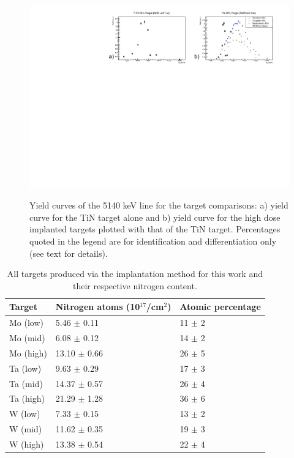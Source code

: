 \begin{figure}
\includegraphics[width=\linewidth]{figures/tiNcompare.pdf}
\label{fig: yieldComparison}
\caption{Yield curves of the 5140 keV line for the target comparisons: a) yield curve for the TiN target alone and b) yield curve for the high dose implanted targets plotted with that of the TiN target. Percentages quoted in the legend are for identification and differentiation only (see text for details).}
\end{figure}


\begin{table}[]
\centering
\begin{tabular}{@{}lll@{}}
\toprule
Target    & Nitrogen atoms (10$^{17}$/cm$^{2}$) & Atomic percentage \\ \midrule
Mo (low)  & 5.46 $\pm$ 0.11                     & 11 $\pm$ 2        \\
Mo (mid)  & 6.08 $\pm$ 0.12                     & 14 $\pm$ 2        \\
Mo (high) & 13.10 $\pm$ 0.66                    & 26 $\pm$ 5        \\
Ta (low)  & 9.63 $\pm$ 0.29                     & 17 $\pm$ 3        \\
Ta (mid)  & 14.37 $\pm$ 0.57                    & 26 $\pm$ 4        \\
Ta (high) & 21.29 $\pm$ 1.28                    & 36 $\pm$ 6        \\
W (low)   & 7.33 $\pm$ 0.15                     & 13 $\pm$ 2        \\
W (mid)   & 11.62 $\pm$ 0.35                    & 19 $\pm$ 3        \\
W (high)  & 13.38 $\pm$ 0.54                    & 22 $\pm$ 4        \\ \bottomrule
\end{tabular}
\caption{All targets produced via the implantation method for this work and their respective nitrogen content. }
\label{table: implantedTargets}
\end{table}



